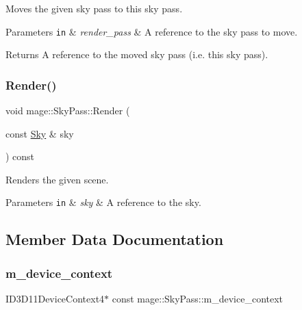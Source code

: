 Moves the given sky pass to this sky pass.


\begin{DoxyParams}[1]{Parameters}
\mbox{\tt in}  & {\em render\+\_\+pass} & A reference to the sky pass to move. \\
\hline
\end{DoxyParams}
\begin{DoxyReturn}{Returns}
A reference to the moved sky pass (i.\+e. this sky pass). 
\end{DoxyReturn}
\hypertarget{classmage_1_1_sky_pass_a832e22543e9de25e316dd03d96ccf34b}{}\label{classmage_1_1_sky_pass_a832e22543e9de25e316dd03d96ccf34b} 
\subsubsection{\texorpdfstring{Render()}{Render()}}
{\footnotesize\ttfamily void mage\+::\+Sky\+Pass\+::\+Render (\begin{DoxyParamCaption}\item[{const \hyperlink{classmage_1_1_sky}{Sky} \&}]{sky }\end{DoxyParamCaption}) const\hspace{0.3cm}{\ttfamily [noexcept]}}

Renders the given scene.


\begin{DoxyParams}[1]{Parameters}
\mbox{\tt in}  & {\em sky} & A reference to the sky. \\
\hline
\end{DoxyParams}


\subsection{Member Data Documentation}
\hypertarget{classmage_1_1_sky_pass_aaa4d6a7c12dbad7938433f2d32107f27}{}\label{classmage_1_1_sky_pass_aaa4d6a7c12dbad7938433f2d32107f27} 
\subsubsection{\texorpdfstring{m\+\_\+device\+\_\+context}{m\_device\_context}}
{\footnotesize\ttfamily I\+D3\+D11\+Device\+Context4$\ast$ const mage\+::\+Sky\+Pass\+::m\+\_\+device\+\_\+context\hspace{0.3cm}{\ttfamily [private]}}

